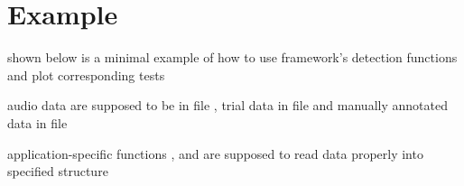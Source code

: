 \section{Example}
\begin{itemize*}
	\item shown below is a minimal example of how to use framework's detection functions and plot corresponding tests
	\item audio data are supposed to be in file , trial data in file  and manually annotated data in file 
	\item application-specific functions ,  and  are supposed to read data properly into specified  structure
\end{itemize*}

